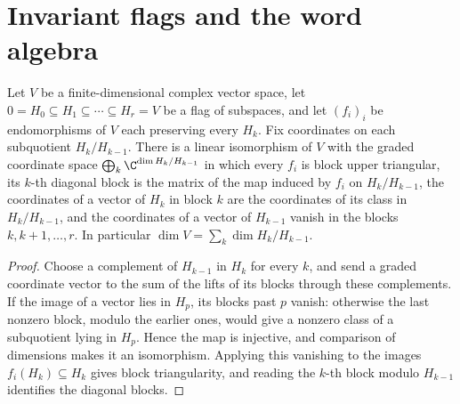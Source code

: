 \section{Invariant flags and the word algebra}

\begin{lemma}
    \label{lem:asym_composition_gauge}
    \leanok
    Let $V$ be a finite-dimensional complex vector space, let
    $0=H_0\subseteq H_1\subseteq\cdots\subseteq H_r=V$ be a flag of
    subspaces, and let $(f_i)_i$ be endomorphisms of $V$ each preserving every
    $H_k$. Fix coordinates on each subquotient $H_k/H_{k-1}$. There is a
    linear isomorphism of $V$ with the graded coordinate space
    $\bigoplus_k\C^{\dim H_k/H_{k-1}}$ in which every $f_i$ is block upper
    triangular, its $k$-th diagonal block is the matrix of the map induced by
    $f_i$ on $H_k/H_{k-1}$, the coordinates of a vector of $H_k$ in block $k$
    are the coordinates of its class in $H_k/H_{k-1}$, and the coordinates of
    a vector of $H_{k-1}$ vanish in the blocks $k,k+1,\ldots,r$. In
    particular $\dim V=\sum_k\dim H_k/H_{k-1}$.
\end{lemma}

\begin{proof}
    \leanok
    Choose a complement of $H_{k-1}$ in $H_k$ for every $k$, and send a
    graded coordinate vector to the sum of the lifts of its blocks through
    these complements. If the image of a vector lies in $H_p$, its blocks past
    $p$ vanish: otherwise the last nonzero block, modulo the earlier ones,
    would give a nonzero class of a subquotient lying in $H_{p}$. Hence the
    map is injective, and comparison of dimensions makes it an isomorphism.
    Applying this vanishing to the images $f_i(H_k)\subseteq H_k$ gives block
    triangularity, and reading the $k$-th block modulo $H_{k-1}$ identifies
    the diagonal blocks.
\end{proof}

